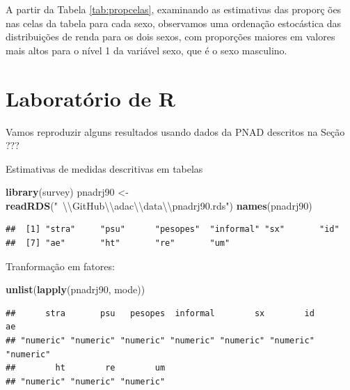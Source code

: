 \documentclass[]{book}
\newenvironment{Shaded}{\begin{snugshade}}{\end{snugshade}}
\newcommand{\KeywordTok}[1]{\textcolor[rgb]{0.13,0.29,0.53}{\textbf{{#1}}}}
\newcommand{\CharTok}[1]{\textcolor[rgb]{0.31,0.60,0.02}{{#1}}}
\newcommand{\StringTok}[1]{\textcolor[rgb]{0.31,0.60,0.02}{{#1}}}
\newcommand{\NormalTok}[1]{{#1}}
\numberwithin{example}{chapter}
\numberwithin{remark}{chapter}
\numberwithin{definition}{chapter}
\let\BeginKnitrBlock\begin \let\EndKnitrBlock\end
\begin{document}
A partir da Tabela \ref{tab:propcelas}, examinando as estimativas das
proporç ões nas celas da tabela para cada sexo, observamos uma ordenação
estocástica das distribuições de renda para os dois sexos, com
proporções maiores em valores mais altos para o nível 1 da variável
sexo, que é o sexo masculino.

\section{Laboratório de R}\label{laboratorio-de-r-5}

Vamos reproduzir alguns resultados usando dados da PNAD descritos na
Seção ???

\BeginKnitrBlock{example}
\protect\hypertarget{ex:unnamed-chunk-100}{}{\label{ex:unnamed-chunk-100}}Estimativas
de medidas descritivas em tabelas
\EndKnitrBlock{example}

\begin{Shaded}
\begin{Highlighting}[]
\KeywordTok{library}\NormalTok{(survey)}
\NormalTok{pnadrj90 <-}\StringTok{ }\KeywordTok{readRDS}\NormalTok{(}\StringTok{"~}\CharTok{\textbackslash{}\textbackslash{}}\StringTok{GitHub}\CharTok{\textbackslash{}\textbackslash{}}\StringTok{adac}\CharTok{\textbackslash{}\textbackslash{}}\StringTok{data}\CharTok{\textbackslash{}\textbackslash{}}\StringTok{pnadrj90.rds"}\NormalTok{)}
\KeywordTok{names}\NormalTok{(pnadrj90)}
\end{Highlighting}
\end{Shaded}

\begin{verbatim}
##  [1] "stra"     "psu"      "pesopes"  "informal" "sx"       "id"      
##  [7] "ae"       "ht"       "re"       "um"
\end{verbatim}

Tranformação em fatores:

\begin{Shaded}
\begin{Highlighting}[]
\KeywordTok{unlist}\NormalTok{(}\KeywordTok{lapply}\NormalTok{(pnadrj90, mode))}
\end{Highlighting}
\end{Shaded}

\begin{verbatim}
##      stra       psu   pesopes  informal        sx        id        ae 
## "numeric" "numeric" "numeric" "numeric" "numeric" "numeric" "numeric" 
##        ht        re        um 
## "numeric" "numeric" "numeric"
\end{verbatim}
\end{document}
